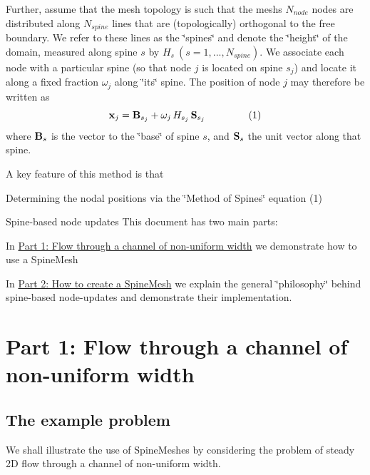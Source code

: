 Further, assume that the mesh topology is such that the mesh\textquotesingle{}s $ N_{node} $ nodes are distributed along $ N_{spine} $ lines that are (topologically) orthogonal to the free boundary. We refer to these lines as the \char`\"{}spines\char`\"{} and denote the \char`\"{}height\char`\"{} of the domain, measured along spine $ s $ by $ H_s \ (s=1,...,N_{spine}) $. We associate each node with a particular spine (so that node $ j $ is located on spine $ s_j$) and locate it along a fixed fraction $ \omega_j $ along \char`\"{}its\char`\"{} spine. The position of node $ j $ may therefore be written as \[ {\bf x}_j = {\bf B}_{s_j} + \omega_j \, H_{s_j} \, {\bf S}_{s_j} \ \ \ \ \ \ \ \ \ \ \ \ \ (1) \] where $ {\bf B}_s $ is the vector to the \char`\"{}base\char`\"{} of spine $ s $, and $ {\bf S}_s $ the unit vector along that spine.

A key feature of this method is that

Determining the nodal positions via the \char`\"{}\+Method of Spines\char`\"{} equation (1)

Spine-\/based node updates This document has two main parts\+:
\begin{DoxyItemize}
\item In \hyperlink{index_part1}{Part 1\+: Flow through a channel of non-\/uniform width} we demonstrate how to use a {\ttfamily Spine\+Mesh} 
\item In \hyperlink{index_part2}{Part 2\+: How to create a Spine\+Mesh} we explain the general \char`\"{}philosophy\char`\"{} behind spine-\/based node-\/updates and demonstrate their implementation.
\end{DoxyItemize}

 

\hypertarget{index_part1}{}\section{Part 1\+: Flow through a channel of non-\/uniform width}\label{index_part1}
\hypertarget{index_example}{}\subsection{The example problem}\label{index_example}
We shall illustrate the use of {\ttfamily Spine\+Meshes} by considering the problem of steady 2D flow through a channel of non-\/uniform width.

